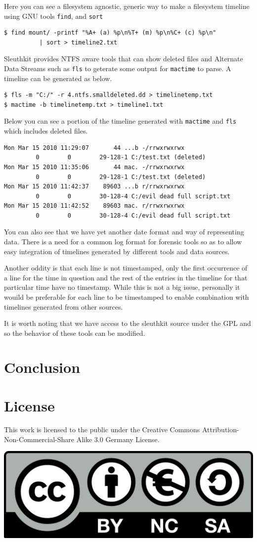 \documentclass[a4paper,
    11pt,
    normalheadings,
    parindent,
    UKenglish,
    abstracton,
    ]{scrartcl}
\begin{document}
Here you can see a filesystem agnostic, generic way to make a filesystem timeline using GNU tools \texttt{find}, and \texttt{sort}
\begin{verbatim}
$ find mount/ -printf "%A+ (a) %p\n%T+ (m) %p\n%C+ (c) %p\n"
          | sort > timeline2.txt
\end{verbatim}

Sleuthkit provides NTFS aware tools that can show deleted files and Alternate Data Streams such as \texttt{fls} to geterate some output for \texttt{mactime} to parse. A timeline can be generated as below.

\begin{verbatim}
$ fls -m "C:/" -r 4.ntfs.smalldeleted.dd > timelinetemp.txt
$ mactime -b timelinetemp.txt > timeline1.txt
\end{verbatim}

Below you can see a portion of the timeline generated with \texttt{mactime} and \texttt{fls} which includes deleted files.

\begin{verbatim}
Mon Mar 15 2010 11:29:07       44 ...b -/rrwxrwxrwx
         0        0        29-128-1 C:/test.txt (deleted)
Mon Mar 15 2010 11:35:06       44 mac. -/rrwxrwxrwx
         0        0        29-128-1 C:/test.txt (deleted)
Mon Mar 15 2010 11:42:37    89603 ...b r/rrwxrwxrwx
         0        0        30-128-4 C:/evil dead full script.txt
Mon Mar 15 2010 11:42:52    89603 mac. r/rrwxrwxrwx
         0        0        30-128-4 C:/evil dead full script.txt
\end{verbatim}
You can also see that we have yet another date format and way of representing data. There is a need for a common log format for forensic tools so as to allow easy integration of timelines generated by different tools and data sources.

Another oddity is that each line is not timestamped, only the first occurrence of a line for the time in question and the rest of the entries in the timeline for that particular time have no timestamp. While this is not a big issue, personally it wouild be preferable for each line to be timestamped to enable combination with timelines generated from other sources.

It is worth noting that we have access to the sleuthkit source under the GPL and so the behavior of these tools can be modified.




\section{Conclusion}

\section*{License}
This work is licensed to the public under the Creative Commons Attribution-Non-Commercial-Share Alike 3.0 Germany License.
\begin{center}\includegraphics{bin/by-nc-sa-eu.png}\end{center}
\end{document}
